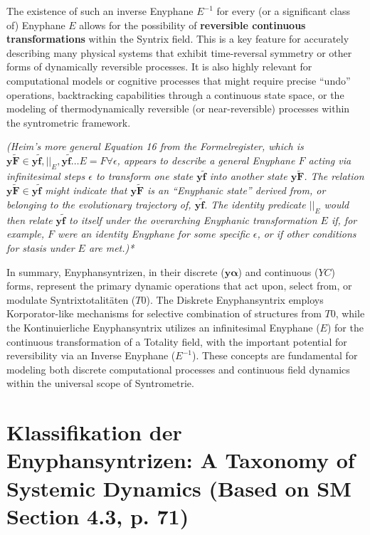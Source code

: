 \documentclass[
    12pt,              %
    a4paper,           %
    headings=normal,   %
    twoside=true,      %
    BCOR=8mm,          %
]{scrbook}
\newcommand{\q}[1]{\enquote{#1}}
\newcommand{\syntrixtotalitaet}{T0}
\newcommand{\diskreteEnyphansyntrix}{\bm{y\alpha}}
\newcommand{\kontinuierlicheEnyphansyntrix}{YC}
\newcommand{\enyphane}{E}
\begin{document}
The existence of such an inverse Enyphane \(\enyphane^{-1}\) for every (or a significant class of) Enyphane \(\enyphane\) allows for the possibility of \textbf{reversible continuous transformations} within the Syntrix field. This is a key feature for accurately describing many physical systems that exhibit time-reversal symmetry or other forms of dynamically reversible processes. It is also highly relevant for computational models or cognitive processes that might require precise \q{undo} operations, backtracking capabilities through a continuous state space, or the modeling of thermodynamically reversible (or near-reversible) processes within the syntrometric framework.

\textit{(Heim’s more general Equation 16 from the Formelregister, which is \( \bm{y\widetilde{F}} \in \bm{y\widetilde{f}}, ||_E, \bm{y\widetilde{f}} \dots E=F\forall\epsilon \), appears to describe a general Enyphane \(F\) acting via infinitesimal steps \(\epsilon\) to transform one state \(\bm{y\widetilde{f}}\) into another state \(\bm{y\widetilde{F}}\). The relation \(\bm{y\widetilde{F}} \in \bm{y\widetilde{f}}\) might indicate that \(\bm{y\widetilde{F}}\) is an \q{Enyphanic state} derived from, or belonging to the evolutionary trajectory of, \(\bm{y\widetilde{f}}\). The identity predicate \(||_E\) would then relate \(\bm{y\widetilde{f}}\) to itself under the overarching Enyphanic transformation \(E\) if, for example, \(F\) were an identity Enyphane for some specific \(\epsilon\), or if other conditions for stasis under \(E\) are met.)*}

In summary, Enyphansyntrizen, in their discrete (\(\diskreteEnyphansyntrix\)) and continuous (\(\kontinuierlicheEnyphansyntrix\)) forms, represent the primary dynamic operations that act upon, select from, or modulate Syntrixtotalitäten (\(\syntrixtotalitaet\)). The Diskrete Enyphansyntrix employs Korporator-like mechanisms for selective combination of structures from \(\syntrixtotalitaet\), while the Kontinuierliche Enyphansyntrix utilizes an infinitesimal Enyphane (\(\enyphane\)) for the continuous transformation of a Totality field, with the important potential for reversibility via an Inverse Enyphane (\(\enyphane^{-1}\)). These concepts are fundamental for modeling both discrete computational processes and continuous field dynamics within the universal scope of Syntrometrie.

\clearpage
\section{Klassifikation der Enyphansyntrizen: A Taxonomy of Systemic Dynamics (Based on SM Section 4.3, p. 71)}
\label{sec:ch4_classification_enyphansyntrizen_revised_full} 
\end{document}
